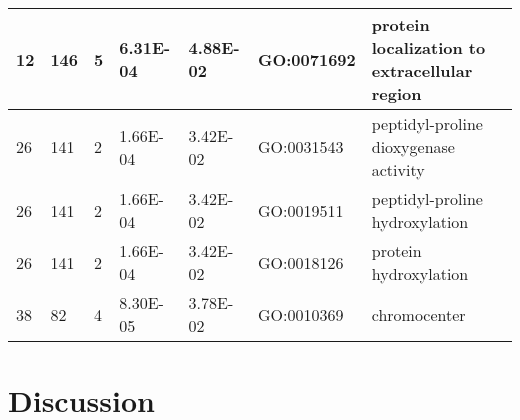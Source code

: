 \begin{landscape}
\begin{table}[h!]
\begin{tabular}{|l|l|l|l|l|l|l|}
12               & 146                                                                   & 5                                                                    & 6.31E-04         & 4.88E-02                                                             & GO:0071692       & protein localization to extracellular region                                                            \\ \hline
26               & 141                                                                   & 2                                                                    & 1.66E-04         & 3.42E-02                                                             & GO:0031543       & peptidyl-proline dioxygenase activity                                                                   \\ \hline
26               & 141                                                                   & 2                                                                    & 1.66E-04         & 3.42E-02                                                             & GO:0019511       & peptidyl-proline hydroxylation                                                                          \\ \hline
26               & 141                                                                   & 2                                                                    & 1.66E-04         & 3.42E-02                                                             & GO:0018126       & protein hydroxylation                                                                                   \\ \hline
38               & 82                                                                    & 4                                                                    & 8.30E-05         & 3.78E-02                                                             & GO:0010369       & chromocenter                                                                                            \\ \hline
\end{tabular}
\end{table}
\end{landscape}

\section{Discussion}
